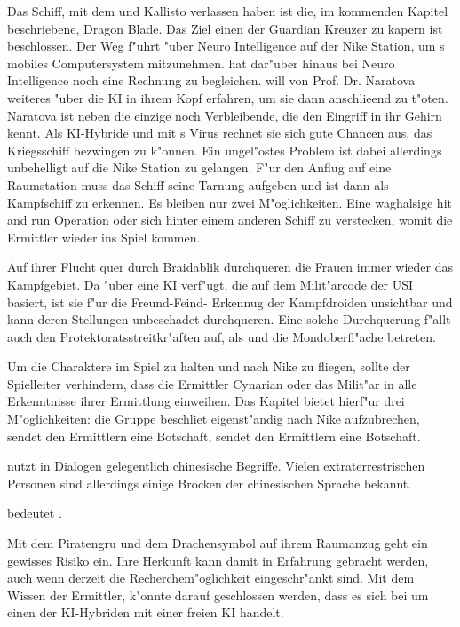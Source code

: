 \begin{remarks}
	Das Schiff, mit dem \xl{} und \ml{} Kallisto verlassen haben ist die, im kommenden Kapitel beschriebene, Dragon Blade. Das Ziel einen der Guardian Kreuzer zu kapern ist beschlossen. Der Weg f"uhrt "uber Neuro Intelligence auf der Nike Station, um \ml{}s mobiles Computersystem mitzunehmen. \xl{} hat dar"uber hinaus bei Neuro Intelligence noch eine Rechnung zu begleichen. \xl{} will von Prof. Dr. Naratova weiteres "uber die KI in ihrem Kopf erfahren, um sie dann anschlie\3end zu t"oten. Naratova ist neben \ml{} die einzige noch Verbleibende, die den Eingriff in ihr Gehirn kennt. Als KI-Hybride und mit \ml{}s Virus rechnet sie sich gute Chancen aus, das Kriegsschiff bezwingen zu k"onnen. Ein ungel"ostes Problem ist dabei allerdings unbehelligt auf die Nike Station zu gelangen. F"ur den Anflug auf eine Raumstation muss das Schiff seine Tarnung aufgeben und ist dann als Kampfschiff zu erkennen. Es bleiben nur zwei M"oglichkeiten. Eine waghalsige hit and run Operation oder sich hinter einem anderen Schiff zu verstecken, womit die Ermittler wieder ins Spiel kommen.

	Auf ihrer Flucht quer durch Braidablik durchqueren die Frauen immer wieder das Kampfgebiet. Da \xl{} "uber eine KI verf"ugt, die auf dem Milit"arcode der USI basiert, ist sie f"ur die Freund-Feind- Erkennug der Kampfdroiden unsichtbar und kann deren Stellungen unbeschadet durchqueren. Eine solche Durchquerung f"allt auch den Protektoratsstreitkr"aften auf, als \xl{} und \ml{} die Mondoberfl"ache betreten. 

	Um die Charaktere im Spiel zu halten und nach Nike zu fliegen, sollte der Spielleiter verhindern, dass die Ermittler Cynarian oder das Milit"ar in alle Erkenntnisse ihrer Ermittlung einweihen. Das Kapitel bietet hierf"ur drei M"oglichkeiten: die Gruppe beschlie\3t eigenst"andig nach Nike aufzubrechen, \xl{} sendet den Ermittlern eine Botschaft, \ml{} sendet den Ermittlern eine Botschaft.

	\xl{} nutzt in Dialogen gelegentlich chinesische Begriffe. Vielen extraterrestrischen Personen sind allerdings einige Brocken der chinesischen Sprache bekannt. 
	
	 bedeutet .

	Mit dem Piratengru\3 und dem Drachensymbol auf ihrem Raumanzug geht \xl{} ein gewisses Risiko ein. Ihre Herkunft kann damit in Erfahrung gebracht werden, auch wenn derzeit die Recherchem"oglichkeit eingeschr"ankt sind. Mit dem Wissen der Ermittler, k"onnte darauf geschlossen werden, dass es sich bei \xl{} um einen der KI-Hybriden mit einer freien KI handelt.
\end{remarks}
\vfill